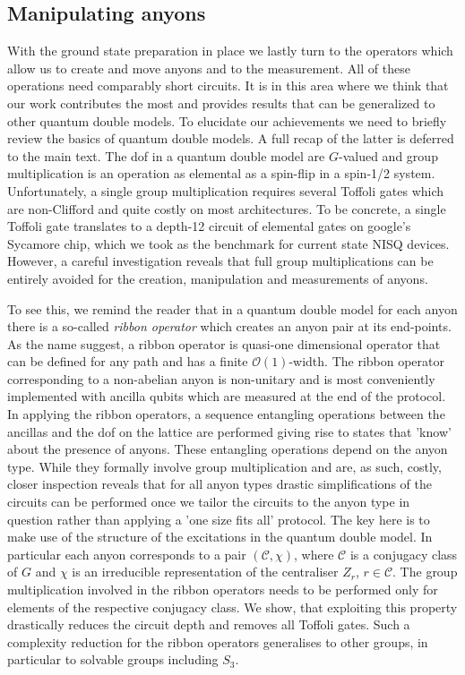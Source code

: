 \documentclass[two column]{article}
\begin{document}
\subsection{Manipulating anyons}
With the ground state preparation in place we lastly turn to the operators which allow us to create and move anyons and to the measurement. All of these operations need comparably short circuits. It is in this area where we think that our work contributes the most and provides results that can be generalized to other quantum double models. To elucidate our achievements we need to briefly review the basics of quantum double models. A full recap of the latter is deferred to the main text. The dof in a quantum double model are $G$-valued and group multiplication is an operation as elemental as a spin-flip in a spin-1/2 system. Unfortunately, a single group multiplication requires several Toffoli gates which are non-Clifford and quite costly on most architectures. To be concrete, a single Toffoli gate translates to a depth-12 circuit of elemental gates on google's Sycamore chip, which we took as the benchmark for current state NISQ devices. However, a careful investigation reveals that full group multiplications can be entirely avoided for the creation, manipulation and measurements of anyons. 

To see this, we remind the reader that in a quantum double model for each anyon there is a so-called \emph{ribbon operator} which creates an anyon pair at its end-points. As the name suggest, a ribbon operator is quasi-one dimensional operator that can be defined for any path and has a finite $\mathcal O(1)$-width. The ribbon operator corresponding to a non-abelian anyon is non-unitary and is most conveniently implemented with ancilla qubits which are measured at the end of the protocol\cite{Cirac}. In applying the ribbon operators, a sequence entangling operations between the ancillas and the dof on the lattice are performed giving rise to states that 'know' about the presence of anyons. These entangling operations depend on the anyon type. While they formally involve group multiplication and are, as such, costly, closer inspection reveals that for all anyon types drastic simplifications of the circuits can be performed once we tailor the circuits to the anyon type in question rather than applying a 'one size fits all' protocol. The key here is to make use of the structure of the excitations in the quantum double model. In particular each anyon corresponds to a pair $(\mathcal C,\chi)$, where $\mathcal C$ is a conjugacy class of $G$ and $\chi$ is an irreducible representation of the centraliser $Z_r$, $r \in \mathcal C$. The group multiplication involved in the ribbon operators needs to be performed only for elements of the respective conjugacy class. We show, that exploiting this property drastically reduces the circuit depth and removes all Toffoli gates. Such a complexity reduction for the ribbon operators generalises to other groups, in particular to solvable groups including $S_3$. 
\end{document}
